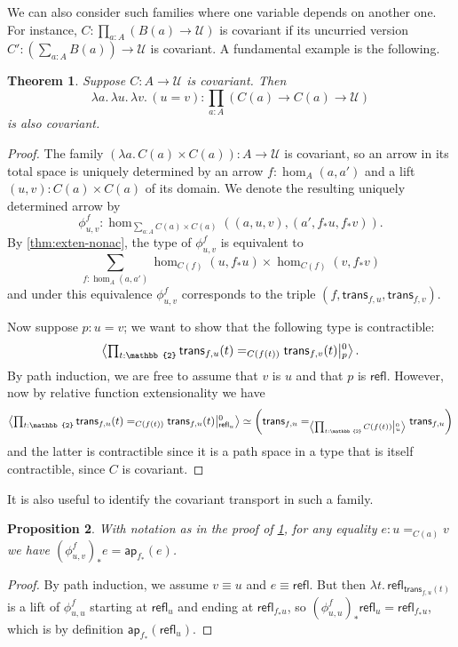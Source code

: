 \documentclass[12pt]{amsart}
\theoremstyle{plain}
\newtheorem{thm}{Theorem}[section]
\newtheorem{prop}[thm]{Proposition}
\theoremstyle{definition}
\theoremstyle{remark}
\numberwithin{equation}{section}
\newcommand{\exten}[4]{\left\langle\mathchoice{\textstyle\prod_{#1}}{\textstyle\prod_{#1}}{\scriptstyle\prod_{#1}}{\scriptscriptstyle\prod_{#1}} #2 \middle|^{#3}_{#4}\right\rangle}
\newcommand{\jdeq}{\equiv}
\newcommand{\univtype}{\mathcal{U}}
\newcommand{\refl}{\mathsf{refl}}
\newcommand{\lam}[1]{\lambda #1.\,}
\newcommand{\two}{\mathbb{2}}
\newcommand{\ap}{\mathsf{ap}}                             %
\newcommand{\covtr}[1]{{#1}_*}  %
\newcommand{\istrans}[2]{\mathsf{trans}_{#1,#2}}
\begin{document}
We can also consider such families where one variable depends on another one.
For instance, $C : \prod_{a:A} (B(a) \to\univtype)$ is covariant if its uncurried version $C' : \left(\sum_{a:A} B(a)\right) \to \univtype$ is covariant.
A fundamental example is the following.

\begin{thm}\label{thm:eq-covar}
  Suppose $C:A\to\univtype$ is covariant.
  Then
  \[\lam{a}\lam{u}\lam{v} (u=v) : \prod_{a:A} (C(a) \to C(a) \to \univtype)\]
  is also covariant.
\end{thm}
\begin{proof}
  The family $(\lam{a} C(a)\times C(a)) : A \to \univtype$ is covariant, so an arrow in its total space is uniquely determined by an arrow $f:\hom_A(a,a')$ and a lift $(u,v) : C(a)\times C(a)$ of its domain.
  We denote the resulting uniquely determined arrow by
  \[ \phi^f_{u,v} : \hom_{\sum_{a:A} C(a)\times C(a)}((a,u,v),(a',\covtr f u,\covtr f v)). \]
  By \cref{thm:exten-nonac}, the type of $\phi^f_{u,v}$ is equivalent to
  \[ \sum_{f:\hom_A(a,a')} \hom_{C(f)}(u,\covtr f u) \times \hom_{C(f)}(v,\covtr f v) \]
  and under this equivalence $\phi^f_{u,v}$ corresponds to the triple $(f,\istrans f u, \istrans f v)$.

  Now suppose $p:u=v$; we want to show that the following type is contractible:
  \[ \exten{t:\two}{\istrans f u(t) =_{C(f(t))} \istrans f v(t)}{0}{p}. \]
  By path induction, we are free to assume that $v$ is $u$ and that $p$ is $\refl$.
  However, now by relative function extensionality we have
  \[ \exten{t:\two}{\istrans f u(t) =_{C(f(t))} \istrans f u(t)}{0}{\refl_u}
  \simeq
  \left(\istrans f u =_{\exten{t:\two}{C(f(t))}{0}{u}} \istrans f u\right)
  \]
  and the latter is contractible since it is a path space in a type that is itself contractible, since $C$ is covariant.
\end{proof}

It is also useful to identify the covariant transport in such a family.

\begin{prop}\label{thm:eq-covtr-ap}
  With notation as in the proof of \cref{thm:eq-covar}, for any equality $e:u=_{C(a)} v$ we have $\covtr {(\phi^f_{u,v})}{e} = \ap_{\covtr f }(e)$.
\end{prop}
\begin{proof}
  By path induction, we assume $v\jdeq u$ and $e\jdeq \refl$.
  But then $\lam{t} \refl_{\istrans f u(t)}$ is a lift of $\phi^f_{u,u}$ starting at $\refl_u$ and ending at $\refl_{\covtr f u}$, so $\covtr {(\phi^f_{u,u})}{\refl_u} = \refl_{\covtr f u}$, which is by definition $\ap_{\covtr f }(\refl_u)$.
\end{proof}
\end{document}
